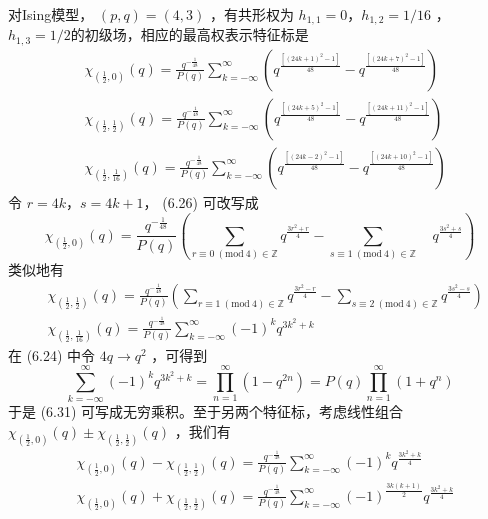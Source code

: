 对Ising模型， $(p, q)=(4,3)$ ，有共形权为 $h_{1,1}=0 $，$ h_{1,2}=1/16$ ，$ h_{1,3}=1/2 $的初级场，相应的最高权表示特征标是
\begin{align} &\chi_{\left(\frac{1}{2}, 0\right)}(q)=\frac{q^{-\frac{1}{48}}}{P(q)} \sum_{k=-\infty}^{\infty}\left(q^{\frac{\left[(24 k+1)^{2}-1\right]}{48}}-q^{\frac{\left[(24 k+7)^{2}-1\right]}{48}}\right) \\ &\chi_{\left(\frac{1}{2}, \frac{1}{2}\right)}(q)=\frac{q^{-\frac{1}{48}}}{P(q)} \sum_{k=-\infty}^{\infty}\left(q^{\frac{\left[(24 k+5)^{2}-1\right]}{48}}-q^{\frac{\left[(24 k+11)^{2}-1\right]}{48}}\right) \\ &\chi_{\left(\frac{1}{2}, \frac{1}{16}\right)}(q)=\frac{q^{-\frac{1}{48}}}{P(q)} \sum_{k=-\infty}^{\infty}\left(q^{\frac{\left[(24 k-2)^{2}-1\right]}{48}}-q^{\frac{\left[(24 k+10)^{2}-1\right]}{48}}\right) \end{align}
令 $r=4k $，$ s=4k+1 $， (6.26) 可改写成
\begin{equation}
	\chi_{\left(\frac{1}{2}, 0\right)}(q)=\frac{q^{-\frac{1}{48}}}{P(q)}\left( \sum_{r\equiv 0\ (\text{mod}\ 4)\in \mathbb{Z}} q^{\frac{3 r^{2}+r}{4}}-\sum_{s\equiv 1\ (\text{mod}\ 4)\in \mathbb{Z}} \quad q^{\frac{3 s^{2}+s}{4}}\right)
\end{equation} 
类似地有
\begin{align} &\chi_{\left(\frac{1}{2}, \frac{1}{2}\right)}(q)=\frac{q^{-\frac{1}{48}}}{P(q)}\left( \sum_{r\equiv 1\ (\text{mod}\ 4)\in \mathbb{Z}} q^{\frac{3 r^{2}-r}{4}}-\sum_{s\equiv 2\ (\text{mod}\ 4)\in \mathbb{Z}}q^{\frac{3s^2-s}{4}}\right)\\ &\chi_{\left(\frac{1}{2}, \frac{1}{16}\right)}(q)=\frac{q^{-\frac{1}{48}}}{P(q)} \sum_{k=-\infty}^{\infty}(-1)^{k} q^{3 k^{2}+k} \end{align}
在 (6.24) 中令 $4q\to q^2$ ，可得到
\begin{equation}
	\sum_{k=-\infty}^{\infty}(-1)^{k} q^{3 k^{2}+k}=\prod_{n=1}^{\infty}\left(1-q^{2 n}\right)=P(q) \prod_{n=1}^{\infty}\left(1+q^{n}\right) 
\end{equation}
于是 (6.31) 可写成无穷乘积。至于另两个特征标，考虑线性组合 $\chi_{\left(\frac{1}{2}, 0\right)}(q) \pm \chi_{\left(\frac{1}{2}, \frac{1}{2}\right)}(q)$ ，我们有
\begin{align} &\chi_{\left(\frac{1}{2}, 0\right)}(q)-\chi_{\left(\frac{1}{2}, \frac{1}{2}\right)}(q)=\frac{q^{-\frac{1}{48}}}{P(q)} \sum_{k=-\infty}^{\infty}(-1)^{k} q^{\frac{3 k^{2}+k}{4}} \\ &\chi_{\left(\frac{1}{2}, 0\right)}(q)+\chi_{\left(\frac{1}{2}, \frac{1}{2}\right)}(q)=\frac{q^{-\frac{1}{48}}}{P(q)} \sum_{k=-\infty}^{\infty}(-1)^{\frac{3 k(k+1)}{2}} q^{\frac{3 k^{2}+k}{4}}\end{align}
